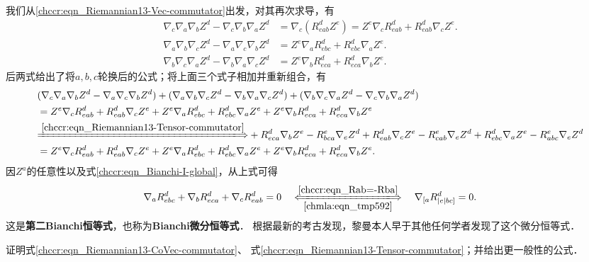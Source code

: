 我们从\eqref{chccr:eqn_Riemannian13-Vec-commutator}出发，对其再次求导，有
\begin{align*}
    \nabla_c\nabla_a \nabla_b Z^d - \nabla_c\nabla_b \nabla_a Z^d &=\nabla_c (R_{eab}^d Z^e)
    =Z^e \nabla_c R_{eab}^d + R_{eab}^d \nabla_c Z^e . \\
    \nabla_a\nabla_b \nabla_c Z^d - \nabla_a\nabla_c \nabla_b Z^d &=Z^e \nabla_a R_{ebc}^d + R_{ebc}^d \nabla_a Z^e .\\
    \nabla_b\nabla_c \nabla_a Z^d - \nabla_b\nabla_a \nabla_c Z^d &=Z^e \nabla_b R_{eca}^d + R_{eca}^d \nabla_b Z^e .
\end{align*}
后两式给出了将$a,b,c$轮换后的公式；将上面三个式子相加并重新组合，有
\begin{align*}
   &(\nabla_c\nabla_a \nabla_b Z^d - \nabla_a\nabla_c \nabla_b Z^d)+
    (\nabla_a\nabla_b \nabla_c Z^d - \nabla_b\nabla_a \nabla_c Z^d) +
    (\nabla_b\nabla_c \nabla_a Z^d - \nabla_c\nabla_b \nabla_a Z^d)  \\
   &= Z^e \nabla_c R_{eab}^d + R_{eab}^d \nabla_c Z^e  +
      Z^e \nabla_a R_{ebc}^d + R_{ebc}^d \nabla_a Z^e +
      Z^e \nabla_b R_{eca}^d + R_{eca}^d \nabla_b Z^e \\
   &{\xLongrightarrow{\ref{chccr:eqn_Riemannian13-Tensor-commutator}}}
      +R_{eca}^d \nabla_b Z^e  -R_{bca}^e \nabla_e Z^d
      +R_{eab}^d \nabla_c Z^e  -R_{cab}^e \nabla_e Z^d
      +R_{ebc}^d \nabla_a Z^e  -R_{abc}^e \nabla_e Z^d \\
   &= Z^e \nabla_c R_{eab}^d + R_{eab}^d \nabla_c Z^e  +
      Z^e \nabla_a R_{ebc}^d + R_{ebc}^d \nabla_a Z^e +
      Z^e \nabla_b R_{eca}^d + R_{eca}^d \nabla_b Z^e .
\end{align*}   %
因$Z^a$的任意性以及式\eqref{chccr:eqn_Bianchi-I-global}，从上式可得
\begin{equation}\label{chccr:eqn_Bianchi-II-global}
    \nabla_a R_{ebc}^d + \nabla_b R_{eca}^d + \nabla_c R_{eab}^d = 0 \quad
    \xLongleftrightarrow[\ref{chmla:eqn_tmp592}]{\ref{chccr:eqn_Rab=-Rba}}\quad
    \nabla_{[a} R_{|e|bc]}^d = 0.
\end{equation}
这是{\heiti\bfseries 第二Bianchi恒等式}，也称为{\heiti\bfseries Bianchi微分恒等式}．
根据最新的考古\cite{Darrigol-2015}发现，黎曼本人早于其他任何学者发现了这个微分恒等式．


\begin{exercise}
	证明式\eqref{chccr:eqn_Riemannian13-CoVec-commutator}、
	式\eqref{chccr:eqn_Riemannian13-Tensor-commutator}；并给出更一般性的公式．
\end{exercise}

